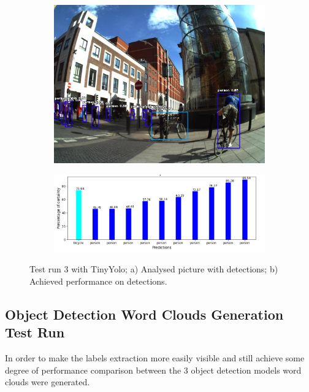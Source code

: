           \begin{figure}[H]
            \centering
            \captionsetup{justification=centering}
    
            \begin{subfigure}{0.29\textwidth}
            \includegraphics[width=\textwidth]{Sections/4InitialWork/4_images_obj_run4/yolo_tiny.jpg} 
            \caption{}
            \end{subfigure}
            \begin{subfigure}{0.65\textwidth}
            \includegraphics[width=\textwidth]{Sections/4InitialWork/4_images_obj_run4/tiny_yolo_graph.png}
            \caption{}
            \end{subfigure}
            
            \caption{ 
            Test run 3 with TinyYolo; a) Analysed picture with detections; b) Achieved performance on detections. }
            \end{figure}


    \newpage

    \subsection{Object Detection Word Clouds Generation Test Run}
    In order to make the labels extraction more easily visible and still achieve some degree of performance comparison between the 3 object detection models word clouds were generated.

